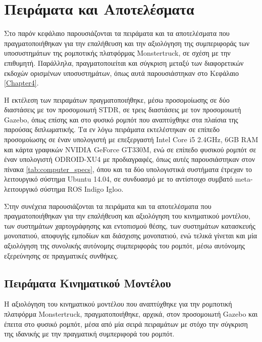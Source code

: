 
\chapter{Πειράματα και Αποτελέσματα} \label{Chapter5}
Στο παρόν κεφάλαιο παρουσιάζονται τα πειράματα και τα αποτελέσματα που πραγματοποιήθηκαν για την επαλήθευση και την αξιολόγηση της συμπεριφοράς των υποσυστημάτων της ρομποτικής πλατφόρμας Monstertruck, σε σχέση με την επιθυμητή. Παράλληλα, πραγματοποιείται και σύγκριση μεταξύ των διαφορετικών εκδοχών ορισμένων υποσυστημάτων, όπως αυτά παρουσιάστηκαν στο Κεφάλαιο \ref{Chapter4}. 

\bigskip
Η εκτέλεση των πειραμάτων πραγματοποιήθηκε, μέσω προσομοίωσης σε δύο διαστάσεις με τον προσομοιωτή STDR, σε τρεις διαστάσεις με τον προσομοιωτή Gazebo, όπως επίσης και στο φυσικό ρομπότ που αναπτύχθηκε στα πλαίσια της παρούσας διπλωματικής. Τα εν λόγω πειράματα εκτελέστηκαν σε επίπεδο προσομοίωσης σε έναν υπολογιστή με επεξεργαστή Intel Core i5 2.4GHz, 6GB RAM και κάρτα γραφικών NVIDIA GeForce GT330M, ενώ σε επίπεδο φυσικού ρομπότ σε έναν υπολογιστή ODROID-XU4 με προδιαγραφές, όπως αυτές παρουσιάστηκαν στον πίνακα \ref{tab:computer_specs}, όπου και τα δύο υπολογιστικά συστήματα έτρεχαν το λειτουργικό σύστημα Ubuntu 14.04, σε συνδυασμό με το αντίστοιχο συμβατό meta-λειτουργικό σύστημα ROS Indigo Igloo.

\bigskip
Στην συνέχεια παρουσιάζονται τα πειράματα και τα αποτελέσματα που πραγματοποιήθηκαν για την επαλήθευση και αξιολόγηση του κινηματικού μοντέλου, των συστημάτων χαρτογράφησης και εντοπισμού θέσης, των συστημάτων κατασκευής μονοπατιού, αποφυγής εμποδίων και διάσχισης μονοπατιού, ενώ τελικά γίνεται και μία αξιολόγηση της συνολικής αυτόνομης συμπεριφοράς του ρομπότ, μέσω αυτόνομης εξερεύνησης σε πραγματικές συνθήκες.

\section{Πειράματα Κινηματικού Μοντέλου} \label{sec:kinematics_experiments}
Η αξιολόγηση του κινηματικού μοντέλου που αναπτύχθηκε για την ρομποτική πλατφόρμα Monstertruck, πραγματοποιήθηκε, αρχικά, στον προσομοιωτή Gazebo και έπειτα στο φυσικό ρομπότ, μέσα από μία σειρά πειραμάτων με στόχο την σύγκριση της ιδανικής με την πραγματική συμπεριφορά του ρομπότ.  

